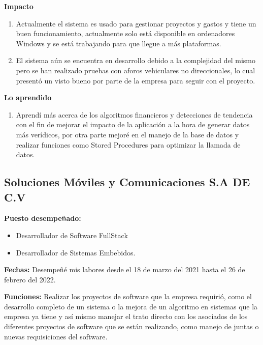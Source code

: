 \documentclass[protocolo.tex]{subfiles}
\begin{document}
\textbf{Impacto}
\begin{enumerate}
\item Actualmente el sistema es usado para gestionar proyectos y gastos y tiene un buen funcionamiento, actualmente solo está disponible en ordenadores Windows y se está trabajando para que llegue a más plataformas.
\item El sistema aún se encuentra en desarrollo debido a la complejidad del mismo pero se han realizado pruebas con aforos vehiculares no direccionales, lo cual presentó un visto bueno por parte de la empresa para seguir con el proyecto.
\end{enumerate}

\textbf{Lo aprendido}
\begin{enumerate}
\item Aprendí más acerca de los algoritmos financieros y detecciones de tendencia con el fin de mejorar el impacto de la aplicación a la hora de generar datos más verídicos, por otra parte mejoré en el manejo de la base de datos y realizar funciones como Stored Procedures para optimizar la llamada de datos.
\end{enumerate}

\vfill %
\subsection{Soluciones Móviles y Comunicaciones S.A DE C.V}

\textbf{Puesto desempeñado:} 
\begin{itemize}
\item Desarrollador de Software FullStack
\item Desarrollador de Sistemas Embebidos.
\end{itemize}

\textbf{Fechas:}
Desempeñé mis labores desde el 18 de marzo del 2021 hasta el 26 de febrero del 2022.

\textbf{Funciones:}
Realizar los proyectos de software que la empresa requirió, como el desarrollo completo de
un sistema o la mejora de un algoritmo en sistemas que la empresa ya tiene y así mismo
manejar el trato directo con los asociados de los diferentes proyectos de software que se
están realizando, como manejo de juntas o nuevas requisiciones del software.
\end{document}
